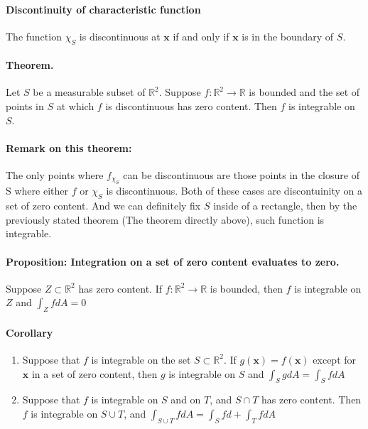 \documentclass[11pt]{article}
\newcommand{\bx}[0]{\mathbf{x}}
\newcommand{\real}[0]{\mathbb{R}}
\begin{document}
\paragraph{Discontinuity of characteristic function} The function $\chi_S$ is discontinuous at $\bx$ if and only if $\bx$ is in the boundary of $S$.

\paragraph{Theorem.} Let $S$ be a measurable subset of $\real^2$. Suppose $f:{\real^2} \rightarrow{}{\real}$ is bounded and the set of points in $S$ at which $f$ is discontinuous has zero content. Then $f$ is integrable on $S$. 
\paragraph{Remark on this theorem:} The only points where $f_{\chi_S}$ can be discontinuous are those points in the closure of S where either $f$ or $\chi_S$ is discontinuous. Both of these cases are discontuinity on a set of zero content. And we can definitely fix $S$ inside of a rectangle, then by the previously stated theorem (The theorem directly above), such function is integrable.

\paragraph{Proposition: Integration on a set of zero content evaluates to zero.} Suppose $Z\subset \real^2$ has zero content. If $f:\real^2\rightarrow{} \real$ is bounded, then $f$ is integrable on $Z$ and $\int_Z fdA = 0$

\paragraph{Corollary}
\begin{enumerate}
    \item Suppose that $f$ is integrable on the set $S\subset \real^2$. If $g(\bx) = f(\bx)$ except for $\bx$ in a set of zero content, then $g$ is integrable on $S$ and $\int_S gdA = \int_S fdA$
    \item Suppose that $f$ is integrable on $S$ and on $T$, and $S\cap T$ has zero content. Then $f$ is integrable on $S\cup T$, and $\int_{S\cup T}fdA = \int_Sfd+ \int_TfdA$
\end{enumerate}
 
\end{document}
